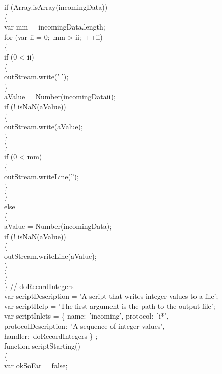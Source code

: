 \tS{}if (Array.isArray(incomingData))\\
\tS\{\\
\tS\tS{}var mm = incomingData.length;\\
        
\tS\tS{}for (var ii = 0;\ mm > ii;\ ++ii)\\
\tS\tS\{\\
\tS\tS\tS{}if (0 < ii)\\
\tS\tS\tS\{\\
\tS\tS\tS\tS{}outStream.write(' ');\\
\tS\tS\tS\}\\
\tS\tS\tS{}aValue = Number(incomingData\openSq{}ii\closeSq);\\
\tS\tS\tS{}if (! isNaN(aValue))\\
\tS\tS\tS\{\\
\tS\tS\tS\tS{}outStream.write(aValue);\\
\tS\tS\tS\}\\
\tS\tS\}\\
\tS\tS{}if (0 < mm)\\
\tS\tS\{\\
\tS\tS\tS{}outStream.writeLine('');\\
\tS\tS\}\\
\tS\}\\
\tS{}else\\
\tS\{\\
\tS\tS{}aValue = Number(incomingData);\\
\tS\tS{}if (! isNaN(aValue))\\
\tS\tS\{\\
\tS\tS\tS{}outStream.writeLine(aValue);\\
\tS\tS\}\\
\tS\}\\
\} // doRecordIntegers\\

var scriptDescription = 'A script that writes integer values to a file';\\

var scriptHelp = 'The first argument is the path to the output file';\\

var scriptInlets = \openSq{} \{ name:\ 'incoming', protocol:\ 'i*',\\
\tS\tS\tS\tS\tS\tS\tS\tS\tS\tS{}protocolDescription:\ 'A sequence of integer values',\\
\tS\tS\tS\tS\tS\tS\tS\tS\tS\tS{}handler:\ doRecordIntegers \} \closeSq;\\
\newpage
function scriptStarting()\\
\{\\
\tS{}var okSoFar = false;\\
    
